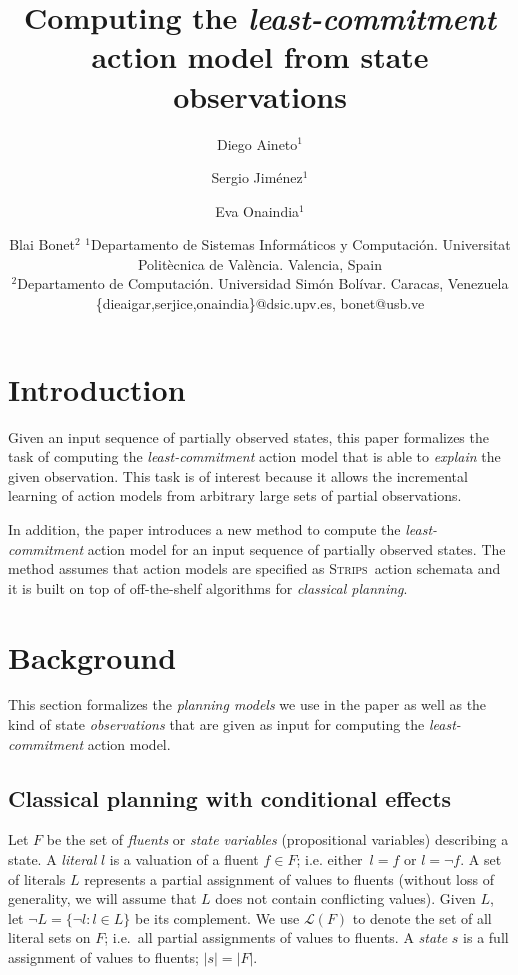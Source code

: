 \documentclass{article}
\title{Computing the {\em least-commitment} action model from state observations}
\author{
Diego Aineto$^1$\and
Sergio Jim\'enez$^1$\and
Eva Onaindia$^1$\And
\and
Blai Bonet$^2$
\affiliations
$^1${\small Departamento de Sistemas Inform\'aticos y Computaci\'on. Universitat Polit\`ecnica de Val\`encia. Valencia, Spain}\\
$^2${\small Departamento de Computaci\'on. Universidad Sim\'on Bolívar. Caracas, Venezuela}
\emails
{\scriptsize \{dieaigar,serjice,onaindia\}@dsic.upv.es, bonet@usb.ve}}
\newcommand{\strips}{\textsc{Strips}}
\begin{document}
\maketitle

\begin{abstract}
  
\end{abstract}

\section{Introduction}
Given an input sequence of partially observed states, this paper formalizes the task of computing the {\em least-commitment} action model that is able to {\em explain} the given observation. This task is of interest because it allows the incremental learning of action models from arbitrary large sets of partial observations.

In addition, the paper introduces a new method to compute the {\em least-commitment} action model for an input sequence of partially observed states. The method assumes that action models are specified as \strips\ action schemata and it is built on top of off-the-shelf algorithms for {\em classical planning}.



\section{Background}
This section formalizes the {\em planning models} we use in the paper as well as the kind of state {\em observations} that are given as input for computing the {\em least-commitment} action model.  

\subsection{Classical planning with conditional effects}
Let $F$ be the set of {\em fluents} or {\em state variables} (propositional variables) describing a state. A {\em literal} $l$ is a valuation of a fluent $f\in F$; i.e. either~$l=f$ or $l=\neg f$. A set of literals $L$ represents a partial assignment of values to fluents (without loss of generality, we will assume that $L$ does not contain conflicting values). Given $L$, let $\neg L=\{\neg l:l\in L\}$ be its complement. We use $\mathcal{L}(F)$ to denote the set of all literal sets on $F$; i.e.~all partial assignments of values to fluents. A {\em state} $s$ is a full assignment of values to fluents; $|s|=|F|$.
\end{document}
